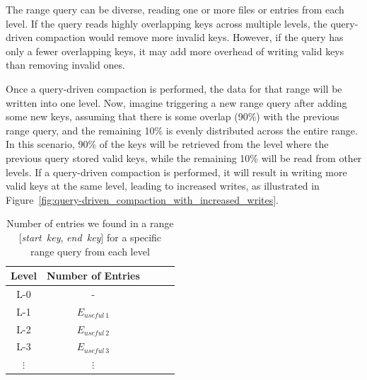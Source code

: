 The range query can be diverse, reading one or more files or entries from each level. If the query reads highly overlapping 
keys across multiple levels, the query-driven compaction would remove more invalid keys. However, if the query has only a 
fewer overlapping keys, it may add more overhead of writing valid keys than removing invalid ones.

Once a query-driven compaction is performed, the data for that range will be written into one level. Now, imagine triggering 
a new range query after adding some new keys, assuming that there is some overlap (90\%) with the previous range query, 
and the remaining 10\% is evenly distributed across the entire range. In this scenario, 90\% of the keys will be 
retrieved from the level where the previous query stored valid keys, while the remaining 10\% will be read from other 
levels. If a query-driven compaction is performed, it will result in writing more valid keys at the same level, leading 
to increased writes, as illustrated in Figure~\ref{fig:query-driven_compaction_with_increased_writes}.



\begin{table}
    \begin{tabular}{|c|c|c|c|c|}
        \hline
        \textbf{Level} & \textbf{Number of Entries} \\
        \hline
        L-0 & \-- \\
        \hline
        L-1 & \textit{$E_{useful\ 1}$} \\
        \hline
        L-2 & \textit{$E_{useful\ 2}$} \\
        \hline
        L-3 & \textit{$E_{useful\ 3}$} \\
        \hline
        $\vdots$ & $\vdots$ \\
        \hline
    \end{tabular}
    \caption{Number of entries we found in a range [\textit{start\ key}, \textit{end\ key}] for a specific range query from each level}
    \label{table:decision-making-meta-data}
\end{table}

